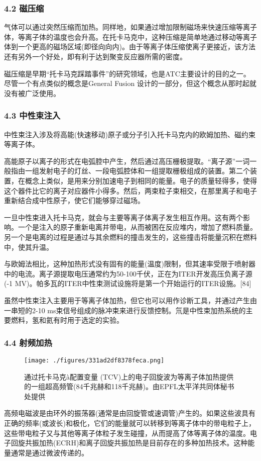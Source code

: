 \subsubsection{4.2 磁压缩}
气体可以通过突然压缩而加热。同样地，如果通过增加限制磁场来快速压缩等离子体，等离子体的温度也会升高。在托卡马克中，这种压缩是简单地通过移动等离子体到一个更高的磁场区域(即径向向内)。由于等离子体压缩使离子更接近，该方法还有另外一个好处，即有利于达到聚变反应器所需的密度。

磁压缩是早期“托卡马克踩踏事件”的研究领域，也是ATC主要设计的目的之一。尽管一个有点类似的概念是General Fusion 设计的一部分，但这个概念从那时起就没有被广泛使用。
\subsubsection{4.3 中性束注入}
中性束注入涉及将高能(快速移动)原子或分子引入托卡马克内的欧姆加热、磁约束等离子体。

高能原子以离子的形式在电弧腔中产生，然后通过高压栅极提取。“离子源”一词一般指由一组发射电子的灯丝、一段电弧腔体和一组提取栅极组成的装置。第二个装置，在概念上类似，是用来分别加速电子到相同的能量。电子的质量轻得多，使得这个器件比它的离子对应器件小得多。然后，两束粒子束相交，在那里离子和电子重新结合成中性原子，使它们能够穿过磁场。

一旦中性束进入托卡马克，就会与主要等离子体离子发生相互作用。这有两个影响。一个是注入的原子重新电离并带电，从而被困在反应堆内，增加了燃料质量。另一个是电离的过程是通过与其余燃料的撞击发生的，这些撞击将能量沉积在燃料中，使其升温。

与欧姆法相比，这种加热形式没有固有的能量(温度)限制，但其速率受限于喷射器中的电流。离子源提取电压通常约为50-100千伏，正在为ITER开发高压负离子源(-1 MV)。帕多瓦的ITER中性束测试设施将是第一个开始运行的ITER设施。[84]

虽然中性束注入主要用于等离子体加热，但它也可以用作诊断工具，并通过产生由一串短的2-10 ms束信号组成的脉冲束来进行反馈控制。氘是中性束加热系统的主要燃料，氢和氦有时用于选定的实验。
\subsubsection{4.4 射频加热}
\begin{figure}[ht]
\centering
\texttt{[image: ./figures/331ad2df8378feca.png]}
\caption{通过托卡马克à配置变量 (TCV)上的电子回旋波为等离子体加热提供的一组超高频管(84千兆赫和118千兆赫)。由EPFL太平洋共同体秘书处提供} \label{fig_TKMK_6}
\end{figure}
高频电磁波是由环外的振荡器(通常是由回旋管或速调管)产生的。如果这些波具有正确的频率(或波长)和极化，它们的能量就可以转移到等离子体中的带电粒子上，这些带电粒子又与其他等离子体粒子发生碰撞，从而提高了体等离子体的温度。电子回旋共振加热(ECRH)和离子回旋共振加热是目前存在的多种加热技术。这种能量通常是通过微波传递的。

